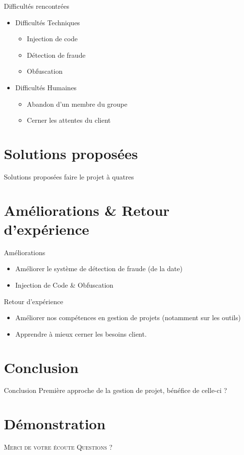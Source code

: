 \documentclass{cubeamer}
\begin{document}
\begin{frame}{Difficultés rencontrées}
    \begin{itemize}
        \item Difficultés Techniques 
              \begin{itemize}
                \item Injection de code
                \item Détection de fraude
                \item Obfuscation
              \end{itemize}
        \item Difficultés Humaines
              \begin{itemize}
                \item Abandon d'un membre du groupe
                \item Cerner les attentes du client
              \end{itemize}
    \end{itemize}
\end{frame}

\section{Solutions proposées}

\begin{frame}{Solutions proposées}
    faire le projet à quatres
\end{frame}

\section{Améliorations \& Retour d'expérience}

\begin{frame}{Améliorations}
    \begin{itemize}
        \item Améliorer le système de détection de fraude (de la date)
        \item Injection de Code \& Obfuscation
    \end{itemize}
\end{frame}

\begin{frame}{Retour d'expérience}
    \begin{itemize}
        \item Améliorer nos compétences en gestion de projets (notamment sur les outils)
        \item Apprendre à mieux cerner les besoins client.
    \end{itemize}
\end{frame}

\section{Conclusion}

\begin{frame}{Conclusion}
    Première approche de la gestion de projet, bénéfice de celle-ci ?  
\end{frame}

\section{Démonstration}

\begin{frame}[standout]
    \Huge\textsc{Merci de votre écoute}
    \vfill
    \LARGE\textsc{Questions ?}
\end{frame}
\end{document}
